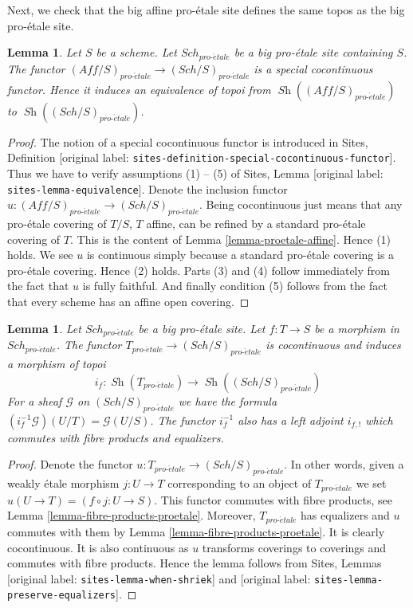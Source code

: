 \documentclass[10pt,a4paper]{article}
\theoremstyle{plain}
\newtheorem{lemma}[subsection]{Lemma}
\theoremstyle{definition}
\theoremstyle{remark}
\numberwithin{equation}{subsection}
\def\Sch{\mathit{Sch}}
\def\Sh{\mathop{\mathit{Sh}}\nolimits}
\def\proetale{{pro\text{-}\acute{e}tale}}
\begin{document}
\noindent
Next, we check that the big affine pro-\'etale site defines the same
topos as the big pro-\'etale site.

\begin{lemma}
\label{lemma-affine-big-site-proetale}
Let $S$ be a scheme. Let $\Sch_\proetale$ be a big pro-\'etale
site containing $S$.
The functor $(\textit{Aff}/S)_\proetale \to (\Sch/S)_\proetale$
is a special cocontinuous functor. Hence it induces an equivalence
of topoi from $\Sh((\textit{Aff}/S)_\proetale)$ to
$\Sh((\Sch/S)_\proetale)$.
\end{lemma}

\begin{proof}
The notion of a special cocontinuous functor is introduced in
Sites, Definition \textnormal{[original label: \nolinkurl{sites-definition-special-cocontinuous-functor}]}.
Thus we have to verify assumptions (1) -- (5) of
Sites, Lemma \textnormal{[original label: \nolinkurl{sites-lemma-equivalence}]}.
Denote the inclusion functor
$u : (\textit{Aff}/S)_\proetale \to (\Sch/S)_\proetale$.
Being cocontinuous just means that any pro-\'etale covering of
$T/S$, $T$ affine, can be refined by a standard pro-\'etale
covering of $T$. This is the content of
Lemma \ref{lemma-proetale-affine}.
Hence (1) holds. We see $u$ is continuous simply because a standard
pro-\'etale covering is a pro-\'etale covering. Hence (2) holds.
Parts (3) and (4) follow immediately from the fact that $u$ is
fully faithful. And finally condition (5) follows from the
fact that every scheme has an affine open covering.
\end{proof}

\begin{lemma}
\label{lemma-put-in-T}
Let $\Sch_\proetale$ be a big pro-\'etale site.
Let $f : T \to S$ be a morphism in $\Sch_\proetale$.
The functor $T_\proetale \to (\Sch/S)_\proetale$
is cocontinuous and induces a morphism of topoi
$$
i_f :
\Sh(T_\proetale)
\longrightarrow
\Sh((\Sch/S)_\proetale)
$$
For a sheaf $\mathcal{G}$ on $(\Sch/S)_\proetale$
we have the formula $(i_f^{-1}\mathcal{G})(U/T) = \mathcal{G}(U/S)$.
The functor $i_f^{-1}$ also has a left adjoint $i_{f, !}$ which commutes
with fibre products and equalizers.
\end{lemma}

\begin{proof}
Denote the functor $u : T_\proetale \to (\Sch/S)_\proetale$.
In other words, given a weakly \'etale morphism $j : U \to T$ corresponding
to an object of $T_\proetale$ we set $u(U \to T) = (f \circ j : U \to S)$.
This functor commutes with fibre products, see
Lemma \ref{lemma-fibre-products-proetale}.
Moreover, $T_\proetale$ has equalizers and $u$ commutes with them
by Lemma \ref{lemma-fibre-products-proetale}.
It is clearly cocontinuous.
It is also continuous as $u$ transforms coverings to coverings and
commutes with fibre products. Hence the lemma follows from
Sites, Lemmas \textnormal{[original label: \nolinkurl{sites-lemma-when-shriek}]}
and \textnormal{[original label: \nolinkurl{sites-lemma-preserve-equalizers}]}.
\end{proof}
\end{document}
